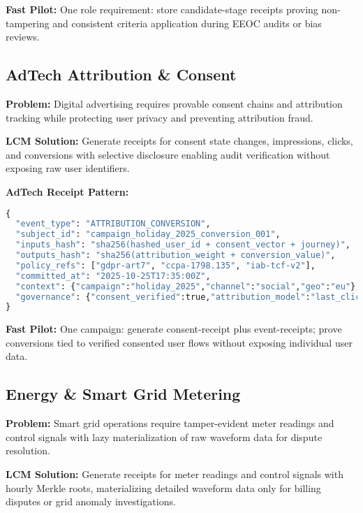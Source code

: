 \documentclass[12pt,a4paper]{article}
\begin{document}
\textbf{Fast Pilot:} One role requirement: store candidate-stage receipts proving non-tampering and consistent criteria application during EEOC audits or bias reviews.

\subsection{AdTech Attribution \& Consent}

\textbf{Problem:} Digital advertising requires provable consent chains and attribution tracking while protecting user privacy and preventing attribution fraud.

\textbf{LCM Solution:} Generate receipts for consent state changes, impressions, clicks, and conversions with selective disclosure enabling audit verification without exposing raw user identifiers.

\begin{technicalbox}
\textbf{AdTech Receipt Pattern:}
\begin{lstlisting}[language=Python, caption=Consent and Attribution Receipt]
{
  "event_type": "ATTRIBUTION_CONVERSION",
  "subject_id": "campaign_holiday_2025_conversion_001",
  "inputs_hash": "sha256(hashed_user_id + consent_vector + journey)",
  "outputs_hash": "sha256(attribution_weight + conversion_value)",
  "policy_refs": ["gdpr-art7", "ccpa-1798.135", "iab-tcf-v2"],
  "committed_at": "2025-10-25T17:35:00Z",
  "context": {"campaign":"holiday_2025","channel":"social","geo":"eu"},
  "governance": {"consent_verified":true,"attribution_model":"last_click"}
}
\end{lstlisting}
\end{technicalbox}

\textbf{Fast Pilot:} One campaign: generate consent-receipt plus event-receipts; prove conversions tied to verified consented user flows without exposing individual user data.

\subsection{Energy \& Smart Grid Metering}

\textbf{Problem:} Smart grid operations require tamper-evident meter readings and control signals with lazy materialization of raw waveform data for dispute resolution.

\textbf{LCM Solution:} Generate receipts for meter readings and control signals with hourly Merkle roots, materializing detailed waveform data only for billing disputes or grid anomaly investigations.
\end{document}
